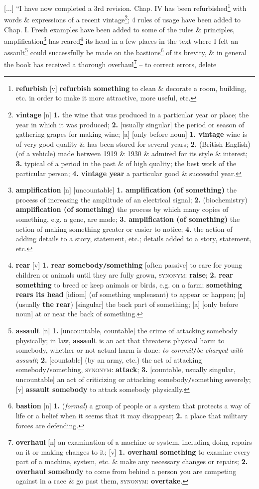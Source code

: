 \documentclass{article}
\begin{document}
[$\ldots$] ``I have now completed a 3rd revision. Chap. IV has been refurbished\footnote{{\bf refurbish} [v] {\bf refurbish something} to clean \& decorate a room, building, etc. in order to make it more attractive, more useful, etc.} with words \& expressions of a recent vintage\footnote{{\bf vintage} [n] {\bf 1.} the wine that was produced in a particular year or place; the year in which it was produced; {\bf 2.} [usually singular] the period or season of gathering grapes for making wine; [a] [only before noun] {\bf 1. vintage} wine is of very good quality \& has been stored for several years; {\bf 2.} (British English) (of a vehicle) made between 1919 \& 1930 \& admired for its style \& interest; {\bf 3.} typical of a period in the past \& of high quality; the best work of the particular person; {\bf 4. vintage year} a particular good \& successful year.}; 4 rules of usage have been added to Chap. I. Fresh examples have been added to some of the rules \& principles, amplification\footnote{{\bf amplification} [n] [uncountable] {\bf 1. amplification (of something)} the process of increasing the amplitude of an electrical signal; {\bf 2.} (biochemistry) {\bf amplification (of something)} the process by which many copies of something, e.g. a gene, are made; {\bf 3. amplification (of something)} the action of making something greater or easier to notice; {\bf 4.} the action of adding details to a story, statement, etc.; details added to a story, statement, etc.} has reared\footnote{{\bf rear} [v] {\bf 1. rear somebody{\tt/}something} [often passive] to care for young children or animals until they are fully grown, \textsc{synonym}: {\bf raise}; {\bf 2. rear something} to breed or keep animals or birds, e.g. on a farm; {\bf something rears its head} [idiom] (of something unpleasant) to appear or happen; [n] (usually {\bf the rear}) [singular] the back part of something; [a] [only before noun] at or near the back of something.} its head in a few places in the text where I felt an assault\footnote{{\bf assault} [n] {\bf 1.} [uncountable, countable] the crime of attacking somebody physically; in law, {\bf assault} is an act that threatens physical harm to somebody, whether or not actual harm is done: {\it to commit}{\tt/}{\it be charged with assault}; {\bf 2.} [countable] (by an army, etc.) the act of attacking somebody{\tt/}something, \textsc{synonym}: {\bf attack}; {\bf 3.} [countable, usually singular, uncountable] an act of criticizing or attacking somebody{\tt/}something severely; [v] {\bf assault somebody} to attack somebody physically.} could successfully be made on the bastions\footnote{{\bf bastion} [n] {\bf 1.} ({\it formal}) a group of people or a system that protects a way of life or a belief when it seems that it may disappear; {\bf 2.} a place that military forces are defending.} of its brevity, \& in general the book has received a thorough overhaul\footnote{{\bf overhaul} [n] an examination of a machine or system, including doing repairs on it or making changes to it; [v] {\bf 1. overhaul something} to examine every part of a machine, system, etc. \& make any necessary changes or repairs; {\bf 2. overhaul somebody} to come from behind a person you are competing against in a race \& go past them, \textsc{synonym}: {\bf overtake}.} -- to correct errors, delete 
\end{document}
